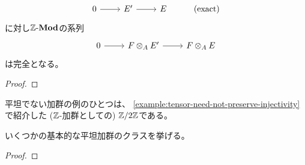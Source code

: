 \documentclass[report]{jlreq}
\begin{document}
\begin{definition}[平坦加群]
\begin{enumerate}
\begin{equation}
\begin{tikzcd}
                    0 \ar{r}
                        & E' \ar{r}
                        & E
                        & (\text{exact})
                \end{tikzcd}
            \end{equation}
            に対し$\mathbb{Z}\text{-}\mathbf{Mod}$の系列
            \begin{equation}
                \begin{tikzcd}
                    0 \ar{r}
                        & F \otimes_A E' \ar{r}
                        & F \otimes_A E
                \end{tikzcd}
            \end{equation}
            は完全となる。
    \end{enumerate}
\end{definition}

\begin{proof}
    \TODO{}
\end{proof}

平坦でない加群の例のひとつは、
\cref{example:tensor-need-not-preserve-injectivity}
で紹介した ($\mathbb{Z}$-加群としての) $\mathbb{Z} / 2\mathbb{Z}$である。

いくつかの基本的な平坦加群のクラスを挙げる。


\begin{proof}
    \TODO{}
\end{proof}
\end{document}
